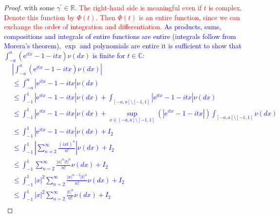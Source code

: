 \documentclass[a4paper,11pt]{article}
\begin{document}
\begin{proof}
    with some $\gamma^{\prime} \in \mathbb{R}$.
    \textcolor{red}{The right-hand side is meaningful even if $t$ is complex. Denote
        this function by $\Phi(t)$. Then $\Phi(t)$ is an entire function, since we can exchange the order of integration and differentiation.}
    \textcolor{blue}{As products, sums, compositions and integrals of entire functions are entire (integrals follow from Morera's theorem), $\exp$ and polynomials are entire it is sufficient to show that $\int_{-a}^{a}\left(\mathrm{e}^{i tx}-1-itx\right) \nu(dx)$ is finite for $t \in \mathbb{C}$:
    \begin{align*}
         & \left|\int_{-a}^{a}\left(\mathrm{e}^{i tx}-1-itx\right) \nu(dx) \right|                                                                                                 \\
         & \leq \int_{-a}^{a}|\mathrm{e}^{i tx}-1-itx| \nu(dx)                                                                                                                     \\
         & \leq \int_{-1}^{1}|\mathrm{e}^{i tx}-1-itx| \nu(dx) + \int_{[-a,a] \setminus [-1,1]}|\mathrm{e}^{i tx}-1-itx| \nu(dx)                                                   \\
         & \leq \int_{-1}^{1}|\mathrm{e}^{i tx}-1-itx| \nu(dx) + \sup_{x \in [-a,a] \setminus [-1,1]}\left(|\mathrm{e}^{i tx}-1-itx|\right) \int_{[-a,a] \setminus [-1,1]} \nu(dx) \\
         & \leq \int_{-1}^{1}|\mathrm{e}^{i tx}-1-itx| \nu(dx) + I_{2}                                                                                                             \\
         & \leq \int_{-1}^{1}\left|\sum_{n=2}^{\infty} \frac{(ixt)^{n}}{n!}\right| \nu(dx) + I_{2}                                                                                 \\
         & \leq \int_{-1}^{1}\sum_{n=2}^{\infty} \frac{|x|^{n}|t|^{n}  }{n!} \nu(dx) + I_{2}                                                                                       \\
         & \leq \int_{-1}^{1}|x|^{2} \sum_{n=2}^{\infty} \frac{|x|^{n-2} |t| ^{n}}{n!} \nu(dx) + I_{2}                                                                             \\
         & \leq \int_{-1}^{1}|x|^{2} \sum_{n=2}^{\infty} \frac{|t|^{n}}{n!} \nu(dx) + I_{2}                                                                                        \\

\end{align*}}
\end{proof}
\end{document}
